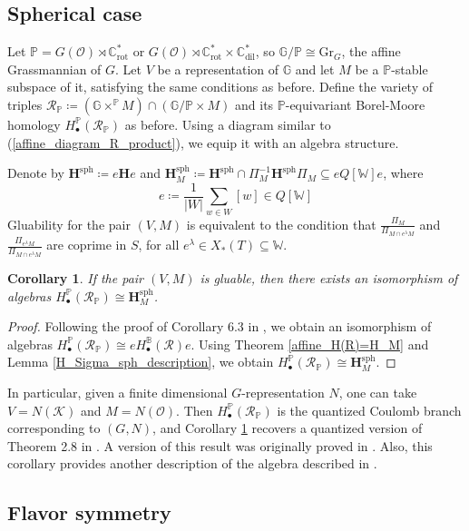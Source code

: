 \documentclass[11pt]{article}
\newcommand{\C}{\mathbb{C}}
\renewcommand{\O}{\mathcal{O}}
\newcommand{\K}{\mathcal{K}}
\newcommand{\R}{\mathcal{R}}
\renewcommand{\H}{\textbf{H}}
\newcommand{\Hsph}{\textbf{H}^\text{sph}}
\renewcommand{\P}{\mathbb{P}}
\newcommand{\bbG}{\mathbb{G}}
\newcommand{\bbB}{\mathbb{B}}
\newcommand{\1}{\mathbb{1}}
\newcommand{\tW}{\mathbb{W}}
\newcommand{\HBM}[2]{H_\bullet^{#1}(#2)}
\newcommand{\Crot}{\C^*_{\text{rot}}}
\newcommand{\Cdil}{\C^*_{\text{dil}}}
\renewcommand{\subset}{\subseteq}
\newtheorem{corollary}[theorem]{Corollary}
\theoremstyle{definition}
\numberwithin{equation}{section}
\begin{document}
\subsection*{Spherical case}

Let $\P = G(\O) \rtimes \Crot$ or $G(\O) \rtimes \Crot \times \Cdil$, so $\bbG / \P \cong \text{Gr}_{G}$, the affine Grassmannian of $G$. Let $V$ be a representation of $\bbG$ and let $M$ be a $\P$-stable subspace of it, satisfying the same conditions as before. Define the variety of triples $\R_\P \coloneqq (\bbG\times^\P M) \cap (\bbG/\P \times M)$ and its $\P$-equivariant Borel-Moore homology $\HBM{\P}{\R_\P}$ as before. Using a diagram similar to (\ref{affine_diagram_R_product}), we equip it with an algebra structure. 

Denote by $\Hsph \coloneqq e \H e$ and $\Hsph_M \coloneqq \Hsph  \cap \Pi_M^{-1} \Hsph \Pi_M \subset eQ[\tW]e$, where
$$e \coloneqq \frac{1}{|W|}\sum_{w\in W} [w] \in Q[\tW]$$
Gluability for the pair $(V,M)$ is equivalent to the condition that $\frac{\Pi_{M}}{\Pi_{M\cap e^\lambda M}}$ and $\frac{\Pi_{e^\lambda M}}{\Pi_{M\cap e^\lambda M}}$ are coprime in $S$, for all $e^\lambda \in X_*(T) \subset \tW$. 

\begin{corollary}
\label{affine_spherical_H(R)=H_M}
    If the pair $(V,M)$ is gluable, then there exists an isomorphism of algebras $\HBM{\P}{\R_\P} \cong \Hsph_M$.
\end{corollary}

\begin{proof}
    Following the proof of Corollary 6.3 in \cite{GKO}, we obtain an isomorphism of algebras $\HBM{\P}{\R_\P} \cong e \HBM{\bbB}{\R} e$. Using Theorem \ref{affine_H(R)=H_M} and Lemma \ref{H_Sigma_sph_description}, we obtain $\HBM{\P}{\R_\P} \cong \Hsph_M$.
\end{proof}

In particular, given a finite dimensional $G$-representation $N$, one can take $V = N(\K)$ and $M=N(\O)$. Then $\HBM{\P}{\R_\P}$ is the quantized Coulomb branch corresponding to $(G,N)$, and Corollary \ref{affine_spherical_H(R)=H_M} recovers a quantized version of Theorem 2.8 in \cite{GW}. A version of this result was originally proved in \cite[Theorem 1]{Tel}. Also, this corollary provides another description of the algebra described in \cite[Corollary 6.3]{GKO}.

\subsection*{Flavor symmetry}
\end{document}

